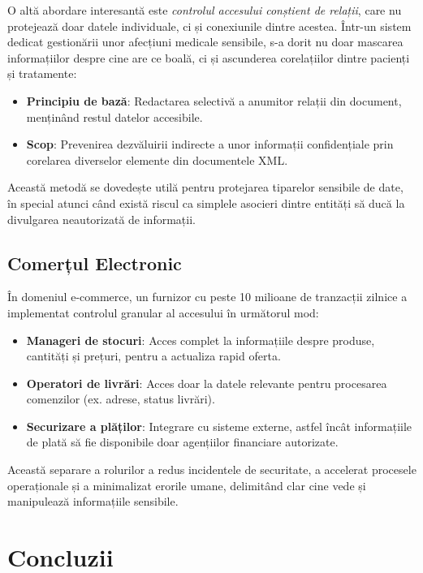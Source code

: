 \documentclass[runningheads]{llncs}
\begin{document}
O altă abordare interesantă este \textit{controlul accesului conștient de relații}, care nu protejează doar datele individuale, ci și conexiunile dintre acestea. Într-un sistem dedicat gestionării unor afecțiuni medicale sensibile, s-a dorit nu doar mascarea informațiilor despre cine are ce boală, ci și ascunderea corelațiilor dintre pacienți și tratamente:

\begin{itemize}
   \item \textbf{Principiu de bază}: Redactarea selectivă a anumitor relații din document, menținând restul datelor accesibile.
   \item \textbf{Scop}: Prevenirea dezvăluirii indirecte a unor informații confidențiale prin corelarea diverselor elemente din documentele XML.
\end{itemize}

Această metodă se dovedește utilă pentru protejarea tiparelor sensibile de date, în special atunci când există riscul ca simplele asocieri dintre entități să ducă la divulgarea neautorizată de informații.

\subsection{Comerțul Electronic}

În domeniul e-commerce, un furnizor cu peste 10 milioane de tranzacții zilnice a implementat controlul granular al accesului în următorul mod:

\begin{itemize}
   \item \textbf{Manageri de stocuri}: Acces complet la informațiile despre produse, cantități și prețuri, pentru a actualiza rapid oferta.
   \item \textbf{Operatori de livrări}: Acces doar la datele relevante pentru procesarea comenzilor (ex. adrese, status livrări).
   \item \textbf{Securizare a plăților}: Integrare cu sisteme externe, astfel încât informațiile de plată să fie disponibile doar agențiilor financiare autorizate.
\end{itemize}

Această separare a rolurilor a redus incidentele de securitate, a accelerat procesele operaționale și a minimalizat erorile umane, delimitând clar cine vede și manipulează informațiile sensibile.

\section{Concluzii}
\end{document}
